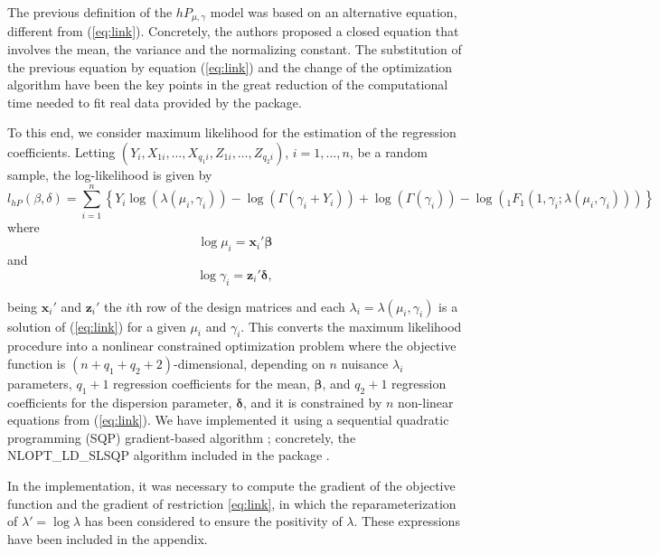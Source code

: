 The previous definition of the $hP_{\mu, \gamma}$ model \citep{hp} was based on an alternative equation, different from (\ref{eq:link}). Concretely, the authors proposed a closed equation that involves the mean, the variance and the normalizing constant. The substitution of the previous equation by equation (\ref{eq:link}) and the change of the optimization algorithm have been the key points in the great reduction of the computational time needed to fit real data provided by the  package.

To this end, we consider maximum likelihood for the estimation of the regression coefficients. Letting $(Y_i, X_{1i}, \dots, X_{q_1i}, Z_{1i}, \dots, Z_{q_2i}) $, $ i = 1, ... , n$, be a random sample, the log-likelihood is given by
\begin{equation}\label{logverhp}
    l_{hP}\left(\beta, \delta\right) = \sum_{i = 1}^n \left\{ Y_i  \log\left(\lambda\left(\mu_i, \gamma_i\right)\right) - \log\left(\Gamma\left(\gamma_i + Y_i\right)\right) + \log\left(\Gamma\left(\gamma_i\right)\right) - \log(_{1}F_{1} \left(1, \gamma_i; \lambda\left(\mu_i, \gamma_i\right) \right)) \right\}
\end{equation}
where
\[
\log \mu_i = \mathbf{x}_i' \boldsymbol{\beta}
\]
and
\[
\log \gamma_i = \mathbf{z}_i' \boldsymbol{\delta},
\]

being $ \mathbf{x}_i' $ and $ \mathbf{z}_i' $ the $i$th row of the design matrices and each $\lambda_i=\lambda\left(\mu_i, \gamma_i\right)$ is a solution of (\ref{eq:link}) for a given $\mu_i$ and $\gamma_i$. This converts the maximum likelihood procedure into a nonlinear constrained optimization problem where the objective function is $(n + q_1 + q_2 + 2)$-dimensional, depending on $n$ nuisance $\lambda_i$ parameters, $q_1 + 1$ regression coefficients for the mean, $\boldsymbol{\beta}$, and $q_2 + 1$ regression coefficients for the dispersion parameter, $\boldsymbol{\delta}$, and it is constrained by $n$ non-linear equations from (\ref{eq:link}). We have implemented it using a sequential quadratic programming (SQP) gradient-based algorithm \citep{kraft1994algorithm}; concretely, the NLOPT\_LD\_SLSQP algorithm included in the  package \citep{nloptr}.

In the implementation, it was necessary to compute the gradient of the objective function and the gradient of restriction \eqref{eq:link}, in which the reparameterization of $ \lambda' = \log \lambda $ has been considered to ensure the positivity of $ \lambda $. These expressions have been included in the appendix.

